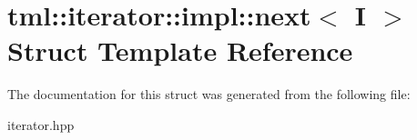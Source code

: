 \hypertarget{structtml_1_1iterator_1_1impl_1_1next}{\section{tml\+:\+:iterator\+:\+:impl\+:\+:next$<$ I $>$ Struct Template Reference}
\label{structtml_1_1iterator_1_1impl_1_1next}
}


The documentation for this struct was generated from the following file\+:\begin{DoxyCompactItemize}
\item 
iterator.\+hpp\end{DoxyCompactItemize}
